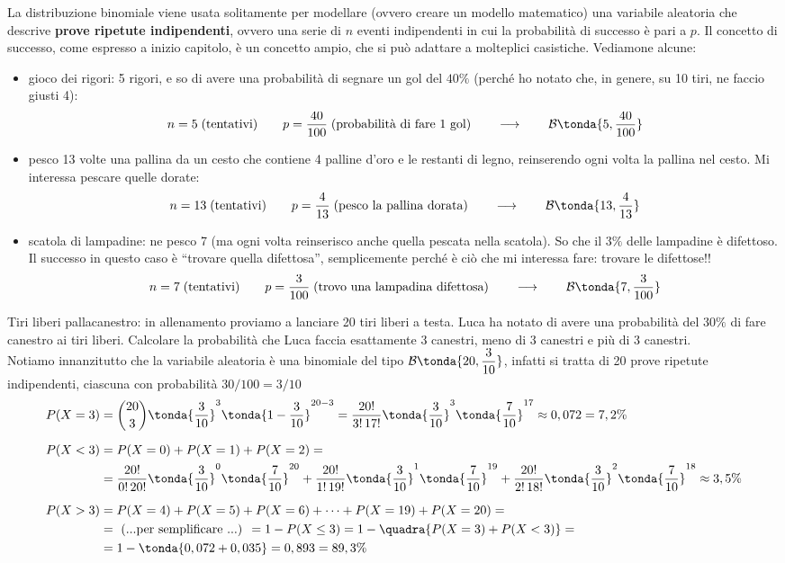 La distribuzione binomiale viene usata solitamente per modellare (ovvero creare un modello matematico) una variabile aleatoria che descrive \textbf{prove ripetute indipendenti}, ovvero una serie di $n$ eventi indipendenti in cui la probabilità di successo è pari a $p$. Il concetto di successo, come espresso a inizio capitolo, è un concetto ampio, che si può adattare a molteplici casistiche. Vediamone alcune:
\begin{itemize}
\item gioco dei rigori: 5 rigori, e so di avere una probabilità di segnare un gol del $40\%$ (perché ho notato che, in genere, su 10 tiri, ne faccio giusti 4):
\[n = 5\; \text{(tentativi)} \qquad p = \dfrac{40}{100} \;\text{(probabilità di fare 1 gol)} \qquad \longrightarrow \qquad \mathcal{B}\tonda{5, \dfrac{40}{100}}\]
\item pesco 13 volte una pallina da un cesto che contiene 4 palline d'oro e le restanti di legno, reinserendo ogni volta la pallina nel cesto. Mi interessa pescare quelle dorate:
\[n = 13\; \text{(tentativi)} \qquad p = \dfrac{4}{13} \;\text{(pesco la pallina dorata)} \qquad \longrightarrow \qquad \mathcal{B}\tonda{13, \dfrac{4}{13}}\]
\item scatola di lampadine: ne pesco 7 (ma ogni volta reinserisco anche quella pescata nella scatola). So che il $3\%$ delle lampadine è difettoso. Il successo in questo caso è ``trovare quella difettosa'', semplicemente perché è ciò che mi interessa fare: trovare le difettose!!
\[n = 7\; \text{(tentativi)} \qquad p = \dfrac{3}{100} \;\text{(trovo una lampadina difettosa)} \qquad \longrightarrow \qquad \mathcal{B}\tonda{7, \dfrac{3}{100}}\]
\end{itemize}
\begin{esempio} Tiri liberi pallacanestro: in allenamento proviamo a lanciare 20 tiri liberi a testa. Luca ha notato di avere una probabilità del $30\%$ di fare canestro ai tiri liberi. Calcolare la probabilità che Luca faccia esattamente 3 canestri, meno di 3 canestri e più di 3 canestri.\\[5pt]
Notiamo innanzitutto che la variabile aleatoria è una binomiale del tipo $\mathcal{B}\tonda{20,\dfrac{3}{10}}$, infatti si tratta di 20 prove ripetute indipendenti, ciascuna con probabilità $30/100 = 3/10$ 
\[\begin{split} P(X = 3) &= \binom{20}{3} \tonda{\dfrac{3}{10}}^3 \tonda{1-\dfrac{3}{10}}^{20-3} = \dfrac{20!}{3!\,17!} \tonda{\dfrac{3}{10}}^3 \tonda{\dfrac{7}{10}}^{17} \approx 0,072 = 7,2\% \\[6pt]
P(X<3) &= P(X=0)+P(X=1)+P(X=2)=\\
&= \dfrac{20!}{0!\,20!} \tonda{\dfrac{3}{10}}^0 \tonda{\dfrac{7}{10}}^{20}+\dfrac{20!}{1!\,19!} \tonda{\dfrac{3}{10}}^1 \tonda{\dfrac{7}{10}}^{19}+\dfrac{20!}{2!\,18!} \tonda{\dfrac{3}{10}}^2 \tonda{\dfrac{7}{10}}^{18} \approx 3,5 \%  \\[6pt]
P(X>3) &=  P(X=4)+P(X=5)+P(X=6)+\dots+P(X=19)+P(X=20)=\\
&= \text{ (...per semplificare ...) } = 1-P(X\leq3) = 1-\quadra{P(X=3)+P(X<3)} = \\
&= 1-\tonda{0,072+0,035} =0,893 =89,3 \% \end{split}\]
\end{esempio}

